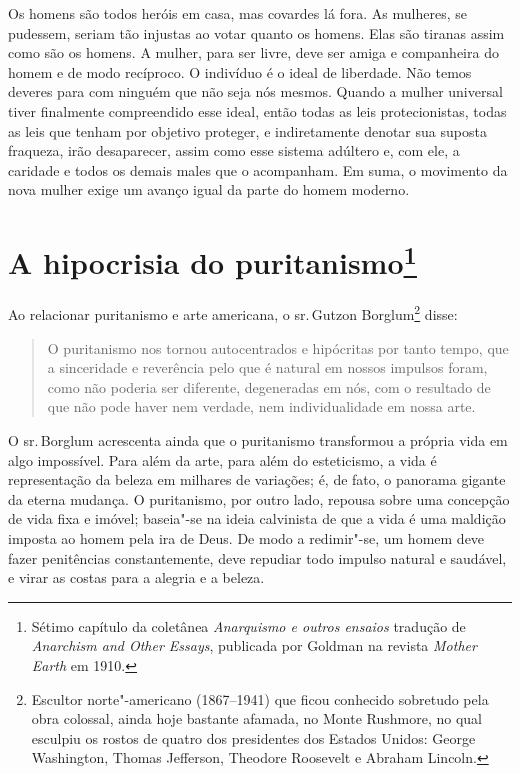 Os homens são todos heróis em casa, mas covardes lá fora. As mulheres,
se pudessem, seriam tão injustas ao votar quanto os homens. Elas são tiranas assim como são os homens. A mulher, para ser livre, deve ser amiga e companheira do homem e de modo
recíproco. O indivíduo é o ideal de liberdade. Não temos deveres para com ninguém que não seja nós mesmos.
Quando a mulher universal tiver finalmente compreendido esse ideal,
então todas as leis protecionistas, todas as leis que tenham por objetivo
proteger, e indiretamente denotar sua suposta fraqueza, irão
desaparecer, assim como esse sistema adúltero e, com ele, a caridade e
todos os demais males que o acompanham. Em suma, o movimento da nova
mulher exige um avanço igual da parte do homem moderno.


\chapter{A hipocrisia do puritanismo\footnote{Sétimo capítulo da coletânea
  \emph{Anarquismo e outros ensaios} tradução de \emph{Anarchism and Other Essays}, publicada por Goldman na revista \textit{Mother Earth} em 1910.}}\label{hipocrisia}

Ao relacionar puritanismo e arte americana, o sr.\,Gutzon Borglum\footnote{Escultor norte"-americano (1867--1941) que ficou conhecido sobretudo pela obra colossal, ainda hoje bastante afamada, no Monte Rushmore, no qual esculpiu os rostos de quatro dos presidentes dos Estados Unidos: George Washington, Thomas Jefferson, Theodore Roosevelt e Abraham Lincoln.} disse:

\begin{quote}
O puritanismo nos tornou autocentrados e hipócritas por tanto tempo,
que a sinceridade e reverência pelo que é natural em nossos impulsos
foram, como não poderia ser diferente, degeneradas em nós, com o
resultado de que não pode haver nem verdade, nem individualidade em
nossa arte.
\end{quote}

O sr.\,Borglum acrescenta ainda que o puritanismo transformou a própria vida
em algo impossível. Para além da arte, para além do esteticismo, a vida
é representação da beleza em milhares de variações; é, de fato, o
panorama gigante da eterna mudança. O puritanismo, por outro lado,
repousa sobre uma concepção de vida fixa e imóvel; baseia"-se na ideia
calvinista de que a vida é uma maldição imposta ao homem pela ira de
Deus. De modo a redimir"-se, um homem deve fazer penitências
constantemente, deve repudiar todo impulso natural e saudável, e virar
as costas para a alegria e a beleza.

